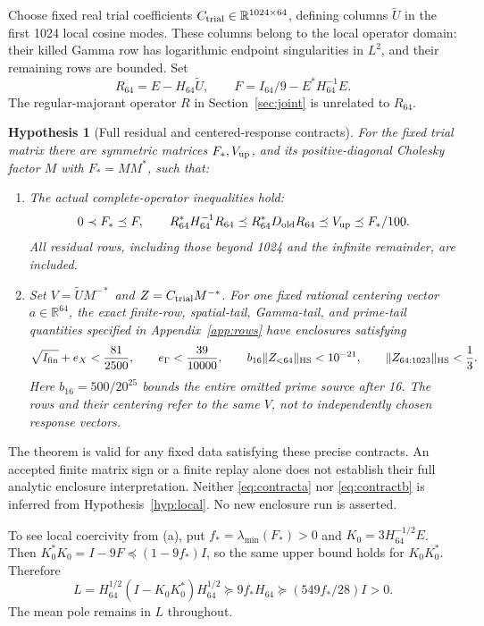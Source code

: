 \documentclass[11pt,a4paper]{article}
\numberwithin{equation}{section}
\newtheorem{hypothesis}[theorem]{Hypothesis}
\theoremstyle{remark}\newtheorem{remark}[theorem]{Remark}
\newcommand{\R}{\mathbb R}\newcommand{\C}{\mathbb C}
\newcommand{\norm}[1]{\lVert#1\rVert}\newcommand{\abs}[1]{\lvert#1\rvert}
\begin{document}
Choose fixed real trial coefficients $C_{\rm trial}\in\R^{1024\times64}$,
defining columns $\widetilde U$ in the first 1024 local cosine modes.
These columns belong to the local operator domain: their killed Gamma row has logarithmic endpoint singularities in $L^2$, and their remaining rows are bounded.
Set
\[
 R_{64}=E-H_{64}\widetilde U,\qquad
 F=I_{64}/9-E^*H_{64}^{-1}E.
\]
The regular-majorant operator $R$ in Section~\ref{sec:joint} is unrelated to $R_{64}$.

\begin{hypothesis}[Full residual and centered-response contracts]\label{hyp:response}
For the fixed trial matrix there are symmetric matrices $F_*,V_{\rm up}$,
and its positive-diagonal Cholesky factor $M$ with $F_*=MM^*$, such that:
\begin{enumerate}[label=\textup{(\alph*)}]
\item The actual complete-operator inequalities hold:
\begin{equation}\label{eq:contracta}
 0\prec F_*\preceq F,\qquad
 R_{64}^*H_{64}^{-1}R_{64}
 \preceq R_{64}^*D_{\rm old}R_{64}
 \preceq V_{\rm up}\preceq F_*/100.
\end{equation}
All residual rows, including those beyond 1024 and the infinite remainder, are included.
\item Set $V=\widetilde U M^{-*}$ and $Z=C_{\rm trial}M^{-*}$.
For one fixed rational centering vector $a\in\R^{64}$, the exact finite-row, spatial-tail, Gamma-tail, and prime-tail quantities specified in Appendix~\ref{app:rows} have enclosures satisfying
\begin{equation}\label{eq:contractb}
 \sqrt{I_{\rm fin}}+e_X<\frac{81}{2500},\qquad
 e_\Gamma<\frac{39}{10000},\qquad
 b_{16}\norm{Z_{<64}}_{\HS}<10^{-21},\qquad
 \norm{Z_{64:1023}}_{\HS}<\frac13.
\end{equation}
Here $b_{16}=500/20^{25}$ bounds the entire omitted prime source after 16.
The rows and their centering refer to the same $V$, not to independently chosen response vectors.
\end{enumerate}
\end{hypothesis}
The theorem is valid for any fixed data satisfying these precise contracts.
An accepted finite matrix sign or a finite replay alone does not establish their full analytic enclosure interpretation.
Neither \eqref{eq:contracta} nor \eqref{eq:contractb} is inferred from Hypothesis~\ref{hyp:local}.
No new enclosure run is asserted.

To see local coercivity from (a), put $f_*=\lambda_{\min}(F_*)>0$ and
$K_0=3H_{64}^{-1/2}E$. Then
$K_0^*K_0=I-9F\preceq(1-9f_*)I$, so the same upper bound holds for
$K_0K_0^*$. Therefore
\begin{equation}\label{eq:Lcoercive}
 L=H_{64}^{1/2}(I-K_0K_0^*)H_{64}^{1/2}
 \succeq9f_*H_{64}\succeq(549f_*/28)I>0.
\end{equation}
The mean pole remains in $L$ throughout.
\end{document}
